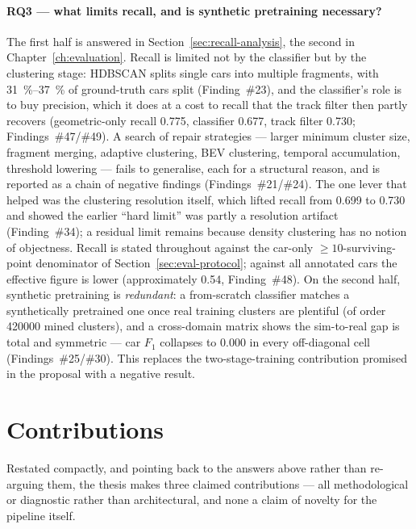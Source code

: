 \paragraph{RQ3 --- what limits recall, and is synthetic pretraining necessary?}
The first half is answered in Section~\ref{sec:recall-analysis}, the second in Chapter~\ref{ch:evaluation}. Recall is limited not by
the classifier but by the clustering stage: HDBSCAN splits single cars into multiple
fragments, with \SIrange{31}{37}{\percent} of ground-truth cars split (Finding~\#23), and
the classifier's role is to buy precision, which it does at a cost to recall that the track
filter then partly recovers (geometric-only recall \num{0.775}, classifier \num{0.677},
track filter \num{0.730}; Findings~\#47/\#49). A search of repair strategies --- larger
minimum cluster size, fragment merging, adaptive clustering, BEV clustering, temporal accumulation,
threshold lowering --- fails to generalise, each for a structural reason, and is reported
as a chain of negative findings (Findings~\#21/\#24). The one lever that helped was the
clustering resolution itself, which lifted recall from \num{0.699} to \num{0.730} and
showed the earlier ``hard limit'' was partly a resolution artifact (Finding~\#34); a
residual limit remains because density clustering has no notion of objectness. Recall is
stated throughout against the car-only $\geq\!10$-surviving-point denominator of
Section~\ref{sec:eval-protocol}; against all annotated cars the effective figure is lower (approximately
\num{0.54}, Finding~\#48). On the second half, synthetic pretraining is \emph{redundant}: a
from-scratch classifier matches a synthetically pretrained one once real training clusters
are plentiful (of order \num{420000} mined clusters), and a cross-domain matrix shows the
sim-to-real gap is total and symmetric --- car $F_1$ collapses to \num{0.000} in every
off-diagonal cell (Findings~\#25/\#30). This replaces the two-stage-training contribution
promised in the proposal with a negative result.

\section{Contributions}
\label{sec:conclusion-contributions}

Restated compactly, and pointing back to the answers above rather than re-arguing them, the
thesis makes three claimed contributions --- all methodological or diagnostic rather than
architectural, and none a claim of novelty for the pipeline itself.

